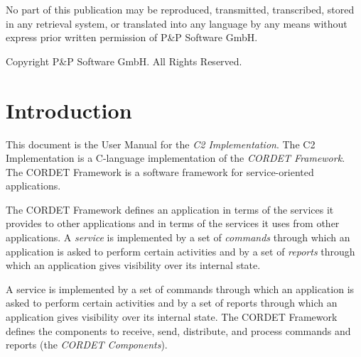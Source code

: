 \documentclass[a4paper,10pt]{article}
\let\stdsection\section
\renewcommand\section{\newpage\stdsection}
\begin{document}
\newpage
\tableofcontents

\newpage
\listoffigures
\listoftables

\newpage
\vspace*{\fill}
\begin{center}
No part of this publication may be reproduced, transmitted, transcribed, stored in any retrieval system, or translated into any language by any means without express prior written permission of P\&P Software GmbH.
\end{center}

\begin{center}
Copyright  P\&P Software GmbH. All Rights Reserved. 
\end{center}
\vspace*{\fill}

\setlength{\parskip}{3mm}						%

\newpage
\section{Introduction}
This document is the User Manual for the \textit{C2 Implementation}. 
The C2 Implementation is a C-language implementation of the \textit{CORDET Framework}.
The CORDET Framework is a software framework for service-oriented applications. 

The CORDET Framework defines an application in terms of the services it provides to other applications and in terms of the services it uses from other applications.
A \textit{service} is implemented by a set of \textit{commands} through which an application is asked to perform certain activities and by a set of \textit{reports} through which an application gives visibility over its internal state.

A service is implemented by a set of commands through which an application is asked to perform certain activities and by a set of reports through which an application gives visibility over its internal state. The CORDET Framework defines the components to receive, send, distribute, and process commands and reports (the \textit{CORDET Components}).
\end{document}
